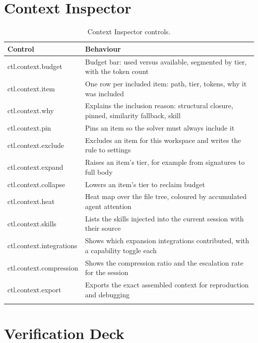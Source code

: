 \section{Context Inspector}

\begin{longtable}{@{}p{} p{}@{}}
\toprule
\textbf{Control} & \textbf{Behaviour} \\
\midrule
\endhead
ctl.context.budget & Budget bar: used versus available, segmented by tier, with the token count \\
ctl.context.item & One row per included item: path, tier, tokens, why it was included \\
ctl.context.why & Explains the inclusion reason: structural closure, pinned, similarity fallback, skill \\
ctl.context.pin & Pins an item so the solver must always include it \\
ctl.context.exclude & Excludes an item for this workspace and writes the rule to settings \\
ctl.context.expand & Raises an item's tier, for example from signatures to full body \\
ctl.context.collapse & Lowers an item's tier to reclaim budget \\
ctl.context.heat & Heat map over the file tree, coloured by accumulated agent attention \\
ctl.context.skills & Lists the skills injected into the current session with their source \\
ctl.context.integrations & Shows which expansion integrations contributed, with a capability toggle each \\
ctl.context.compression & Shows the compression ratio and the escalation rate for the session \\
ctl.context.export & Exports the exact assembled context for reproduction and debugging \\
\bottomrule
\caption{Context Inspector controls.}
\end{longtable}

\section{Verification Deck}

